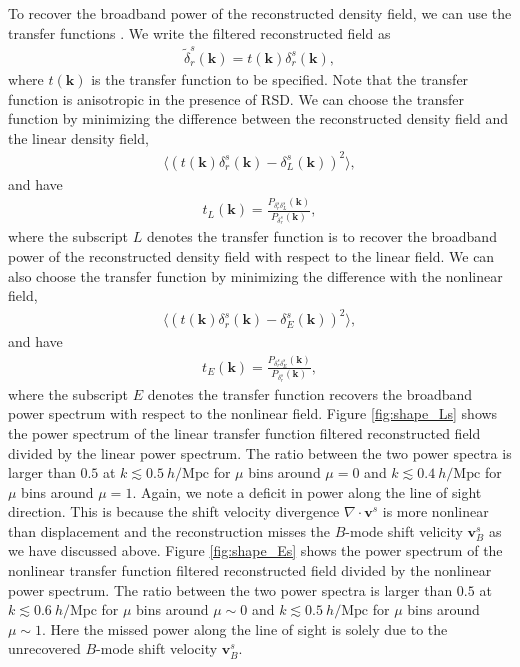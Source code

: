 \documentclass[aps,prx,twocolumn,superscriptaddress,groupedaddress,nofootinbib,amsfont]{revtex4}  %
\newcommand{\mr}{\mathrm}
\newcommand{\bea}{\begin{eqnarray}}
\newcommand{\eea}{\end{eqnarray}}
\newcommand{\bmv}{\bm{v}}
\newcommand{\bmk}{\bm{k}}
\newcommand{\la}{\langle}
\newcommand{\ra}{\rangle}
\begin{document}
To recover the broadband power of the reconstructed density field, we can use 
the transfer functions \cite{2017Marcel}. We write the filtered reconstructed
field as
\bea
\tilde{\delta}_{r}^s(\bmk)=t(\bmk)\delta_r^s(\bmk),
\eea
where $t(\bmk)$ is the transfer function to be specified. Note that the transfer
function is anisotropic in the presence of RSD. 
We can choose the transfer function by minimizing the difference between the 
reconstructed density field and the linear density field,
\bea
\la(t(\bmk){\delta}_r^s(\bmk)-\delta_L^s(\bmk))^2\ra,
\eea
and have 
\bea
t_L(\bmk)=\frac{P_{\delta_r^s\delta_L^s}(\bmk)}{P_{\delta_r^s}(\bmk)},
\eea
where the subscript $L$ denotes the transfer function is to recover the broadband power of the reconstructed density field with respect to the linear field. 
We can also choose the transfer function by minimizing the difference with the
nonlinear field,
\bea
\la(t(\bmk)\delta_r^s(\bmk)-\delta_E^s(\bmk))^2\ra,
\eea
and have 
\bea
t_E(\bmk)=\frac{P_{\delta_r^s\delta_E^s}(\bmk)}{P_{\delta_r^s}(\bmk)},
\eea
where the subscript $E$ denotes the transfer function recovers the broadband
power spectrum with respect to the nonlinear field.
Figure \ref{fig:shape_Ls} shows the power spectrum of the linear transfer 
function filtered reconstructed field divided by the linear power spectrum.
The ratio between the two power spectra is larger than $0.5$ at $k\lesssim0.5\ h/\mr{Mpc}$ for $\mu$ bins around $\mu=0$ and $k\lesssim0.4\ h/\mr{Mpc}$ for
$\mu$ bins around $\mu=1$. Again, we note a deficit in power along the line of
sight direction. This is because the shift velocity divergence 
$\nabla\cdot\bmv^s$ is more nonlinear than displacement and the reconstruction
misses the $B$-mode shift velicity $\bmv^s_B$ as we have discussed above.
Figure \ref{fig:shape_Es} shows the power spectrum of the nonlinear transfer
function filtered reconstructed field divided by the nonlinear power spectrum.
The ratio between the two power spectra is larger than $0.5$ at $k\lesssim0.6\ h/\mr{Mpc}$ for $\mu$ bins around $\mu\sim0$ and $k\lesssim0.5\ h/\mr{Mpc}$ for
$\mu$ bins around $\mu\sim1$. Here the missed power along the line of sight is
solely due to the unrecovered $B$-mode shift velocity $\bmv^s_B$.
\end{document}
